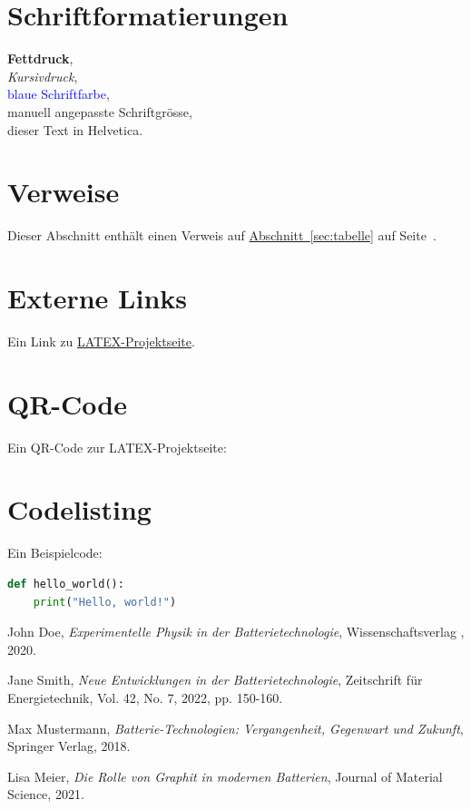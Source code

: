 \documentclass[ngerman, a4paper,12pt]{article}
\begin{document}
\section{Schriftformatierungen}
\textbf{Fettdruck}, \\
\textit{Kursivdruck}, \\
\textcolor{blue}{blaue Schriftfarbe}, \\
\Large manuell angepasste Schriftgrösse, \\
\textsf{dieser Text in Helvetica.}

\section{Verweise}
Dieser Abschnitt enthält einen Verweis auf \hyperref[sec:tabelle]{Abschnitt~\ref*{sec:tabelle}} auf Seite~\pageref{sec:tabelle}.

\section{Externe Links}
Ein Link zu \href{https://www.latex-project.org}{LATEX-Projektseite}.

\section{QR-Code}
Ein QR-Code zur LATEX-Projektseite:

\newpage

\section{Codelisting}
Ein Beispielcode:
\begin{lstlisting}[language=Python, caption={Beispielcode in Python}]
def hello_world():
    print("Hello, world!")
\end{lstlisting}

\newpage

\begin{thebibliography}{99}


 John Doe, \textit{Experimentelle Physik in der Batterietechnologie}, Wissenschaftsverlag , 2020.

 Jane Smith, \textit{Neue Entwicklungen in der Batterietechnologie}, Zeitschrift für Energietechnik, Vol. 42, No. 7, 2022, pp. 150-160.

 Max Mustermann, \textit{Batterie-Technologien: Vergangenheit, Gegenwart und Zukunft}, Springer Verlag, 2018.

 Lisa Meier, \textit{Die Rolle von Graphit in modernen Batterien}, Journal of Material Science, 2021.

\end{thebibliography}

\newpage
\printindex[columns=1, title=Index]
\end{document}
